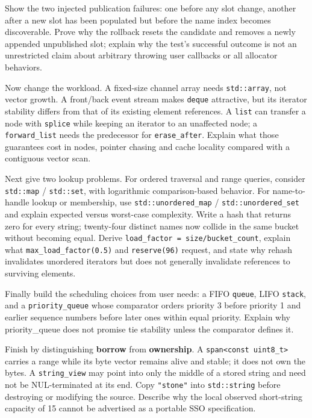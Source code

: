 Show the two injected publication failures: one before any slot change, another after a new slot has been populated but before the name index becomes discoverable. Prove why the rollback resets the candidate and removes a newly appended unpublished slot; explain why the test's successful outcome is not an unrestricted claim about arbitrary throwing user callbacks or all allocator behaviors.

Now change the workload. A fixed-size channel array needs \texttt{std::array}, not vector growth. A front/back event stream makes \texttt{deque} attractive, but its iterator stability differs from that of its existing element references. A \texttt{list} can transfer a node with \texttt{splice} while keeping an iterator to an unaffected node; a \texttt{forward\_list} needs the predecessor for \texttt{erase\_after}. Explain what those guarantees cost in nodes, pointer chasing and cache locality compared with a contiguous vector scan.

Next give two lookup problems. For ordered traversal and range queries, consider \texttt{std::map} / \texttt{std::set}, with logarithmic comparison-based behavior. For name-to-handle lookup or membership, use \texttt{std::unordered\_map} / \texttt{std::unordered\_set} and explain expected versus worst-case complexity. Write a hash that returns zero for every string; twenty-four distinct names now collide in the same bucket without becoming equal. Derive \texttt{load\_factor\ =\ size/bucket\_count}, explain what \texttt{max\_load\_factor(0.5)} and \texttt{reserve(96)} request, and state why rehash invalidates unordered iterators but does not generally invalidate references to surviving elements.

Finally build the scheduling choices from user needs: a FIFO \texttt{queue}, LIFO \texttt{stack}, and a \texttt{priority\_queue} whose comparator orders priority 3 before priority 1 and earlier sequence numbers before later ones within equal priority. Explain why priority\_queue does not promise tie stability unless the comparator defines it.

Finish by distinguishing \textbf{borrow} from \textbf{ownership}. A \texttt{span\textless{}const\ uint8\_t\textgreater{}} carries a range while its byte vector remains alive and stable; it does not own the bytes. A \texttt{string\_view} may point into only the middle of a stored string and need not be NUL-terminated at its end. Copy \texttt{"stone"} into \texttt{std::string} before destroying or modifying the source. Describe why the local observed short-string capacity of 15 cannot be advertised as a portable SSO specification.

